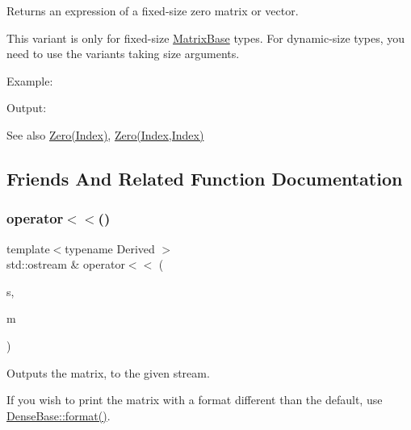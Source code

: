 \begin{DoxyReturn}{Returns}
an expression of a fixed-\/size zero matrix or vector.
\end{DoxyReturn}
This variant is only for fixed-\/size \mbox{\hyperlink{class_eigen_1_1_matrix_base}{Matrix\+Base}} types. For dynamic-\/size types, you need to use the variants taking size arguments.

Example\+: 
\begin{DoxyCodeInclude}{0}
\end{DoxyCodeInclude}
 Output\+: 
\begin{DoxyVerbInclude}
\end{DoxyVerbInclude}


\begin{DoxySeeAlso}{See also}
\mbox{\hyperlink{class_eigen_1_1_dense_base_a55794ebb0c1cba3b998063a45b18378c}{Zero(\+Index)}}, \mbox{\hyperlink{class_eigen_1_1_dense_base_a3832aa9b2ee9ebdb4458003c742c9027}{Zero(\+Index,\+Index)}} 
\end{DoxySeeAlso}


\subsection{Friends And Related Function Documentation}
\mbox{\label{class_eigen_1_1_dense_base_a3806d3f42de165878dace160e6aba40a}} 
\subsubsection{\texorpdfstring{operator$<$$<$()}{operator<<()}}
{\footnotesize\ttfamily template$<$typename Derived $>$ \\
std\+::ostream \& operator$<$$<$ (\begin{DoxyParamCaption}\item[{std\+::ostream \&}]{s,  }\item[{const \mbox{\hyperlink{class_eigen_1_1_dense_base}{Dense\+Base}}$<$ Derived $>$ \&}]{m }\end{DoxyParamCaption})\hspace{0.3cm}{\ttfamily [related]}}

Outputs the matrix, to the given stream.

If you wish to print the matrix with a format different than the default, use \mbox{\hyperlink{class_eigen_1_1_dense_base_ab231f1a6057f28d4244145e12c9fc0c7}{Dense\+Base\+::format()}}.

